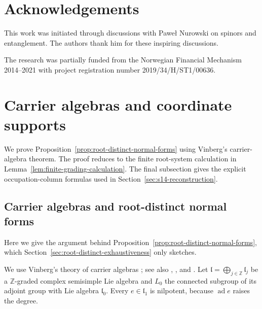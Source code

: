\documentclass{article}
\theoremstyle{definition}
\theoremstyle{remark}
\begin{document}
\section*{Acknowledgements}
This work was initiated through discussions with Paweł Nurowski on spinors and entanglement. The authors thank him for these inspiring discussions.

The research was partially funded from the Norwegian Financial Mechanism 2014–2021 with project registration number 2019/34/H/ST1/00636.

\appendix

\section{Carrier algebras and coordinate supports}
\label{app:finite-calculations}

We prove Proposition~\ref{prop:root-distinct-normal-forms} using Vinberg's
carrier-algebra theorem. The proof reduces to the finite root-system
calculation in Lemma~\ref{lem:finite-grading-calculation}.
The final subsection gives the explicit occupation-column formulas used
in Section~\ref{sec:s14-reconstruction}.

\subsection{Carrier algebras and root-distinct normal forms}
\label{app:carriers}

Here we give the argument behind
Proposition~\ref{prop:root-distinct-normal-forms}, which
Section~\ref{sec:root-distinct-exhaustiveness} only sketches.

We use Vinberg's theory of carrier algebras \cite{Vinberg1979}; see also
\cite[Section~1]{Gatti_dim13}, \cite{deGraaf2011}, \cite[Theorem~25]{Manivel2013}
and \cite{DietrichGlobkeOriglia2022}. Let
$\mathfrak l=\bigoplus_{j\in\mathbb Z}\mathfrak l_j$ be a $\mathbb Z$-graded
complex semisimple Lie algebra and $L_0$ the connected subgroup of its
adjoint group with Lie algebra $\mathfrak l_0$. Every $e\in\mathfrak l_1$ is
nilpotent, because $\operatorname{ad}e$ raises the degree.
\end{document}
